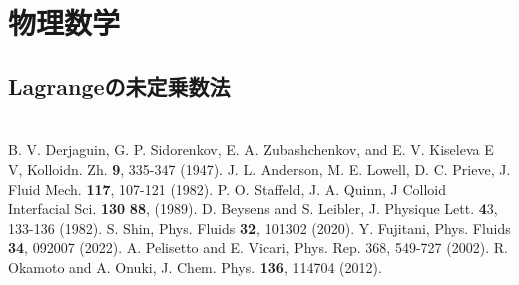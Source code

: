 \documentclass[a4paper,12pt, oneside, openany]{jsbook}
\begin{document}
\section{}

\newpage
\chapter{物理数学}
\section{Lagrangeの未定乗数法}

\appendix
\newpage
\chapter{}

\begin{thebibliography}{9}
  B. V. Derjaguin, G. P. Sidorenkov, E. A. Zubashchenkov, and E. V. Kiseleva E V, Kolloidn. Zh. \textbf{9}, 335-347 (1947).
  J. L. Anderson, M. E. Lowell, D. C. Prieve, J. Fluid Mech. \textbf{117}, 107-121 (1982).
  P. O. Staffeld, J. A. Quinn, J Colloid Interfacial Sci. \textbf{130} \textbf{88}, (1989).
  D. Beysens and S. Leibler, J. Physique Lett. {\textbf43}, 133-136 (1982).
  S. Shin, Phys. Fluids \textbf{32}, 101302 (2020).
  Y. Fujitani, Phys. Fluids \textbf{34}, 092007 (2022).
  A. Pelisetto and E. Vicari, Phys. Rep. 368, 549-727 (2002).
  R. Okamoto and A. Onuki, J. Chem. Phys. \textbf{136}, 114704 (2012).
  
\end{thebibliography}
\end{document}
